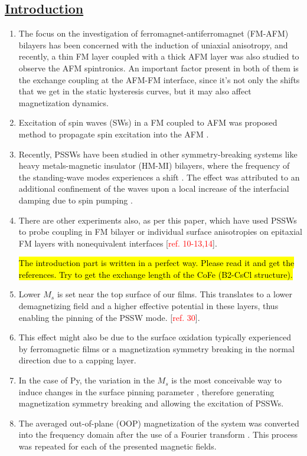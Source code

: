 \subsection*{\underline{Introduction}}
\begin{enumerate}
    \item The focus on the investigation of ferromagnet-antiferromagnet (FM-AFM) bilayers has been concerned with the induction of uniaxial anisotropy, and recently, a thin FM layer coupled with a thick AFM layer was also studied to observe the AFM spintronics. An important factor present in both of them is the exchange coupling at the AFM-FM interface, since it's not only the shifts that we get in the static hysteresis curves, but it may also affect magnetization dynamics.
    \item Excitation of spin waves (SWs) in a FM coupled to AFM was proposed method to propagate spin excitation into the AFM \cite{jenkinsSpinWaveExcitations2020}.
    \item Recently, PSSWs have been studied in other symmetry-breaking systems like heavy metals-magnetic insulator (HM-MI) bilayers, where the frequency of the standing-wave modes experiences a shift \cite{lee2023erratum}. The effect was attributed to an additional confinement of the waves upon a local increase of the interfacial damping due to spin pumping \cite{lee2023erratum}.
    \item There are other experiments also, as per this paper, which have used PSSWs to probe coupling in FM bilayer or individual surface anisotropies on epitaxial FM layers with nonequivalent interfaces [\textcolor{red}{ref. 10-13,14}]. 

\hl{The introduction part is written in a perfect way. Please read it and get the references. Try to get the exchange length of the CoFe (B2-CsCl structure).}


    \item Lower $M_s$ is set near the top surface of our films. This translates to a lower demagnetizing field and a higher effective potential in these layers, thus enabling the pinning of the PSSW mode. [\textcolor{red}{ref. 30}].
    \item This effect might also be due to the surface oxidation typically experienced by ferromagnetic films or a magnetization symmetry breaking in the normal direction due to a capping layer.
    \item In the case of Py, the variation in the $M_s$ is the most conceivable way to induce changes in the surface pinning parameter \cite{waring2023exchange}, therefore generating magnetization symmetry breaking and allowing the excitation of PSSWs.
    \item The averaged out-of-plane (OOP) magnetization of the system was converted into the frequency domain after the use of a Fourier transform \cite{park2003imaging}. This process was repeated for each of the presented magnetic fields.
\end{enumerate}

